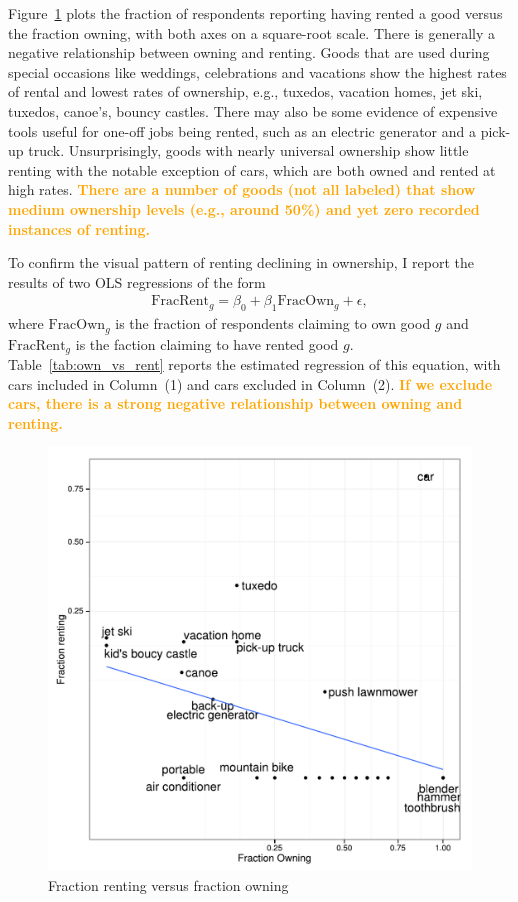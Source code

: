 \documentclass[11pt]{article}
\newcommand{\important}[1]{\textcolor{orange}{\textbf{#1}}}
\newcommand{\important}[1]{#1}
\begin{document}
Figure~\ref{fig:scatter} plots the fraction of respondents reporting having rented a good versus the fraction owning, with both axes on a square-root scale.  
There is generally a negative relationship between owning and renting. 
Goods that are used during special occasions like weddings, celebrations and vacations show the highest rates of rental and lowest rates of ownership, e.g., tuxedos, vacation homes, jet ski, tuxedos, canoe's, bouncy castles. 
There may also be some evidence of expensive tools useful for one-off jobs being rented, such as an electric generator and a pick-up truck. 
Unsurprisingly, goods with nearly universal ownership show little renting with the notable exception of cars, which are both owned and rented at high rates.  
\important{There are a number of goods (not all labeled) that show medium ownership levels (e.g., around 50\%) and yet zero recorded instances of renting.} 

To confirm the visual pattern of renting declining in ownership, I report the results of two OLS regressions of the form
\begin{align}
\mbox{FracRent}_g = \beta_0 + \beta_1 \mbox{FracOwn}_g + \epsilon,  
\end{align} 
where $\mbox{FracOwn}_g$ is the fraction of respondents claiming to own good $g$ and $\mbox{FracRent}_g$ is the faction claiming to have rented good $g$. 
Table~\ref{tab:own_vs_rent} reports the estimated regression of this equation, with cars included in Column~(1) and cars excluded in Column~(2). 
\important{If we exclude cars, there is a strong negative relationship between owning and renting.}


\begin{figure}
\centering 
\caption{Fraction renting versus fraction owning \label{fig:scatter} }
\begin{minipage}{0.60 \linewidth}
\includegraphics[width = \linewidth]{./plots/scatter_rent_v_own.pdf} 
\end{minipage} 
\end{figure} 
\end{document}

